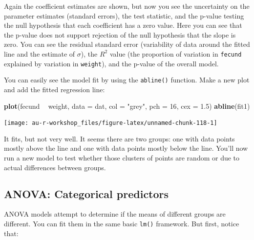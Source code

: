 \documentclass[]{book}
\newenvironment{Shaded}{\begin{snugshade}}{\end{snugshade}}
\newcommand{\KeywordTok}[1]{\textcolor[rgb]{0.13,0.29,0.53}{\textbf{#1}}}
\newcommand{\DataTypeTok}[1]{\textcolor[rgb]{0.13,0.29,0.53}{#1}}
\newcommand{\DecValTok}[1]{\textcolor[rgb]{0.00,0.00,0.81}{#1}}
\newcommand{\FloatTok}[1]{\textcolor[rgb]{0.00,0.00,0.81}{#1}}
\newcommand{\StringTok}[1]{\textcolor[rgb]{0.31,0.60,0.02}{#1}}
\newcommand{\OperatorTok}[1]{\textcolor[rgb]{0.81,0.36,0.00}{\textbf{#1}}}
\newcommand{\NormalTok}[1]{#1}
\theoremstyle{definition}
\theoremstyle{definition}
\theoremstyle{definition}
\theoremstyle{remark}
\begin{document}
Again the coefficient estimates are shown, but now you see the
uncertainty on the parameter estimates (standard errors), the test
statistic, and the p-value testing the null hypothesis that each
coefficient has a zero value. Here you can see that the p-value does not
support rejection of the null hypothesis that the slope is zero. You can
see the residual standard error (variability of data around the fitted
line and the estimate of \(\sigma\)), the \(R^2\) value (the proportion
of variation in \texttt{fecund} explained by variation in
\texttt{weight}), and the p-value of the overall model.

You can easily see the model fit by using the \texttt{abline()}
function. Make a new plot and add the fitted regression line:

\begin{Shaded}
\begin{Highlighting}[]
\KeywordTok{plot}\NormalTok{(fecund }\OperatorTok{~}\StringTok{ }\NormalTok{weight, }\DataTypeTok{data =}\NormalTok{ dat, }\DataTypeTok{col =} \StringTok{"grey"}\NormalTok{, }\DataTypeTok{pch =} \DecValTok{16}\NormalTok{, }\DataTypeTok{cex =} \FloatTok{1.5}\NormalTok{)}
\KeywordTok{abline}\NormalTok{(fit1)}
\end{Highlighting}
\end{Shaded}

\begin{center}\texttt{[image: au-r-workshop\_files/figure-latex/unnamed-chunk-118-1]} \end{center}

It fits, but not very well. It seems there are two groups: one with data
points mostly above the line and one with data points mostly below the
line. You'll now run a new model to test whether those clusters of
points are random or due to actual differences between groups.

\subsection{ANOVA: Categorical predictors}\label{anova}

ANOVA models attempt to determine if the means of different groups are
different. You can fit them in the same basic \texttt{lm()} framework.
But first, notice that:

\begin{Shaded}
\end{Shaded}
\end{document}
